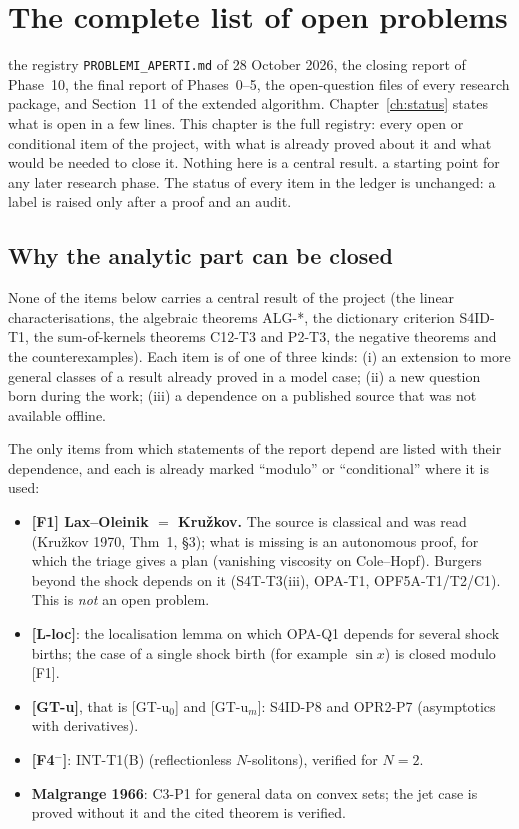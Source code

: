 \chapter{The complete list of open problems}\label{ch:openlist}
\chapterbrief
{the registry \texttt{PROBLEMI\_APERTI.md} of 28 October 2026, the closing report of Phase~10, the final report of Phases~0--5, the open-question files of every research package, and Section~11 of the extended algorithm.}
{Chapter~\ref{ch:status} states what is open in a few lines. This chapter is the full registry: every open or conditional item of the project, with what is already proved about it and what would be needed to close it. Nothing here is a central result.}
{a starting point for any later research phase. The status of every item in the ledger is unchanged: a label is raised only after a proof and an audit.}

\section{Why the analytic part can be closed}

None of the items below carries a central result of the project (the linear characterisations, the algebraic theorems ALG-*, the dictionary criterion S4ID-T1, the sum-of-kernels theorems C12-T3 and P2-T3, the negative theorems and the counterexamples). Each item is of one of three kinds: (i) an extension to more general classes of a result already proved in a model case; (ii) a new question born during the work; (iii) a dependence on a published source that was not available offline.

The only items from which statements of the report depend are listed with their dependence, and each is already marked ``modulo'' or ``conditional'' where it is used:
\begin{itemize}
\item \textbf{[F1] Lax--Oleinik $=$ Kru\v zkov.} The source is classical and was read (Kru\v zkov 1970, Thm~1, \S3); what is missing is an autonomous proof, for which the triage gives a plan (vanishing viscosity on Cole--Hopf). Burgers beyond the shock depends on it (S4T-T3(iii), OPA-T1, OPF5A-T1/T2/C1). This is \emph{not} an open problem.
\item \textbf{[L-loc]}: the localisation lemma on which OPA-Q1 depends for several shock births; the case of a single shock birth (for example $\sin x$) is closed modulo [F1].
\item \textbf{[GT-u]}, that is [GT-u$_0$] and [GT-u$_m$]: S4ID-P8 and OPR2-P7 (asymptotics with derivatives).
\item \textbf{[F4$^-$]}: INT-T1(B) (reflectionless $N$-solitons), verified for $N=2$.
\item \textbf{Malgrange 1966}: C3-P1 for general data on convex sets; the jet case is proved without it and the cited theorem is verified.
\end{itemize}

